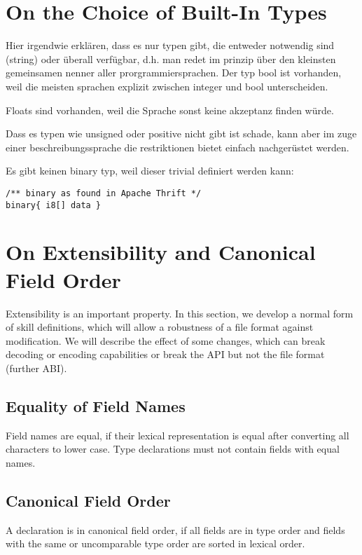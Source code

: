 \documentclass[a4paper,10pt]{article}
\begin{document}
\section{On the Choice of Built-In Types}

Hier irgendwie erklären, dass es nur typen gibt, die entweder notwendig sind (string) oder überall verfügbar, d.h. man redet im prinzip über den kleinsten gemeinsamen nenner aller prorgrammiersprachen. Der typ bool ist vorhanden, weil die meisten sprachen explizit zwischen integer und bool unterscheiden.

Floats sind vorhanden, weil die Sprache sonst keine akzeptanz finden würde.

Dass es typen wie unsigned oder positive nicht gibt ist schade, kann aber im zuge einer beschreibungssprache die restriktionen bietet einfach nachgerüstet werden.

Es gibt keinen binary typ, weil dieser trivial definiert werden kann:
\begin{lstlisting}[label=thriftBinary,caption=Binary,language=skill]
/** binary as found in Apache Thrift */
binary{ i8[] data }
\end{lstlisting}


\section{On Extensibility and Canonical Field Order}

Extensibility is an important property. In this section, we develop a normal form of skill definitions, which will allow a robustness of a file format against modification. We will describe the effect of some changes, which can break decoding or encoding capabilities or break the API but not the file format (further ABI).

\subsection{Equality of Field Names}

Field names are equal, if their lexical representation is equal after converting all characters to lower case. Type declarations must not contain fields with equal names.

\subsection{Canonical Field Order}

A declaration is in canonical field order, if all fields are in type order and fields with the same or uncomparable type order are sorted in lexical order.
\end{document}
